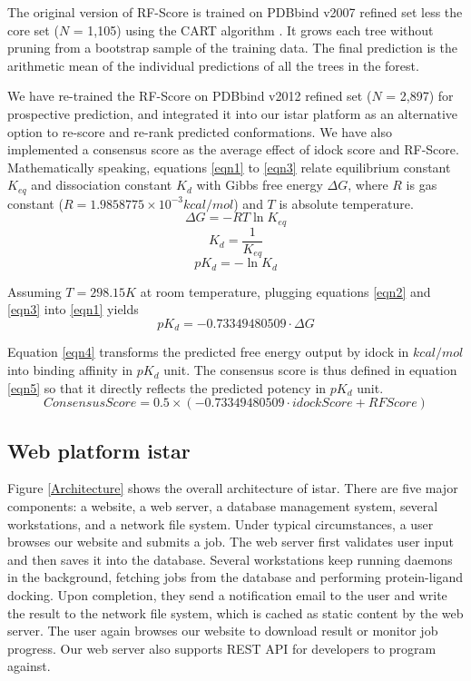 \documentclass[10pt]{article}
\begin{document}
The original version of RF-Score \cite{564} is trained on PDBbind v2007 refined set less the core set ($N$ = 1,105) using the CART algorithm \cite{1310}. It grows each tree without pruning from a bootstrap sample of the training data. The final prediction is the arithmetic mean of the individual predictions of all the trees in the forest.

We have re-trained the RF-Score on PDBbind v2012 refined set ($N$ = 2,897) for prospective prediction, and integrated it into our istar platform as an alternative option to re-score and re-rank predicted conformations. We have also implemented a consensus score as the average effect of idock score and RF-Score. Mathematically speaking, equations \eqref{eqn1} to \eqref{eqn3} relate equilibrium constant $K_{eq}$ and dissociation constant $K_d$ with Gibbs free energy $\Delta G$, where $R$ is gas constant ($R = 1.9858775 \times 10^{-3} kcal/mol$) and $T$ is absolute temperature.
\begin{equation}
\label{eqn1}
\Delta G = -RT\ln K_{eq}
\end{equation}
\begin{equation}
\label{eqn2}
K_d = \frac{1}{K_{eq}}
\end{equation}
\begin{equation}
\label{eqn3}
pK_d = -\ln K_d
\end{equation}

Assuming $T = 298.15K$ at room temperature, plugging equations \eqref{eqn2} and \eqref{eqn3} into \eqref{eqn1} yields
\begin{equation}
\label{eqn4}
pK_d = -0.73349480509 \cdot \Delta G
\end{equation}

Equation \eqref{eqn4} transforms the predicted free energy output by idock in $kcal/mol$ into binding affinity in $pK_d$ unit. The consensus score is thus defined in equation \eqref{eqn5} so that it directly reflects the predicted potency in $pK_d$ unit.
\begin{equation}
\label{eqn5}
ConsensusScore = 0.5 \times (-0.73349480509 \cdot idockScore + RFScore)
\end{equation}

\subsection*{Web platform istar}
Figure \ref{Architecture} shows the overall architecture of istar. There are five major components: a website, a web server, a database management system, several workstations, and a network file system. Under typical circumstances, a user browses our website and submits a job. The web server first validates user input and then saves it into the database. Several workstations keep running daemons in the background, fetching jobs from the database and performing protein-ligand docking. Upon completion, they send a notification email to the user and write the result to the network file system, which is cached as static content by the web server. The user again browses our website to download result or monitor job progress. Our web server also supports REST API for developers to program against.
\end{document}
